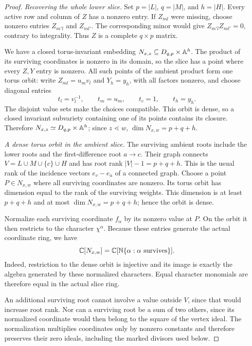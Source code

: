 \begin{proof}
\smallskip\noindent\emph{Recovering the whole lower slice.}
Set $p=|L|$, $q=|M|$, and $h=|H|$. Every active row and column of
$Z$ has a nonzero entry. If $Z_{ml}$ were missing, choose nonzero
entries $Z_{m'l}$ and $Z_{ml'}$. The corresponding minor would give
$Z_{m'l}Z_{ml'}=0$, contrary to integrality. Thus $Z$ is a complete
$q\times p$ matrix.

We have a closed torus-invariant embedding
$N_{x,z}\subseteq D_{q,p}\times\mathbb A^h$. The product of its surviving
coordinates is nonzero in its domain, so the slice has a point where
every $Z,Y$ entry is nonzero. All such points of the ambient product
form one torus orbit: write $Z_{ml}=u_mv_l$ and $Y_h=y_h$, with all
factors nonzero, and choose diagonal entries
\[
 t_l=v_l^{-1},\qquad t_m=u_m,\qquad t_c=1,\qquad t_h=y_h.
\]
The disjoint value sets make the choices compatible. This orbit is
dense, so a closed invariant subvariety containing one of its points
contains its closure. Therefore
$N_{x,z}\simeq D_{q,p}\times\mathbb A^h$; since $z\lessdot w$,
$\dim N_{x,w}=p+q+h$.

\smallskip\noindent\emph{A dense torus orbit in the ambient slice.}
The surviving ambient roots include the lower roots and the
first-difference root $a\longrightarrow c$. Their graph connects
$V=L\cup M\cup\{c\}\cup H$ and has root rank
$|V|-1=p+q+h$. This is the usual rank of the incidence vectors
$e_v-e_u$ of a connected graph. Choose a point $P\in N_{x,w}$ where
all surviving coordinates are nonzero. Its torus orbit has dimension
equal to the rank of the surviving weights. This dimension is at least
$p+q+h$ and at most $\dim N_{x,w}=p+q+h$; hence the orbit is dense.

Normalize each surviving coordinate $f_\alpha$ by its nonzero value
at $P$. On the orbit it then restricts to the character $\chi^\alpha$.
Because these entries generate the actual coordinate ring, we have
\[
 \mathbb C[N_{x,w}]=\mathbb C[\mathbb N\{\alpha:\alpha\text{ survives}\}].
\]
Indeed, restriction to the dense orbit is injective and its image is
exactly the algebra generated by these normalized characters.
Equal character monomials are therefore equal in the actual slice
ring.

An additional surviving root cannot involve a value outside
$V$, since that would increase root rank. Nor can a surviving root
be a sum of two others, since its normalized coordinate would then
belong to the square of the vertex ideal. The normalization multiplies
coordinates only by nonzero constants and therefore preserves their
zero ideals, including the marked divisors used below.


\end{proof}

